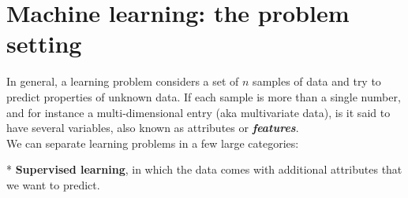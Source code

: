 
\section{Machine learning: the problem setting}

\noindent In general, a learning problem considers a set of $n$ samples of data and try to predict properties of unknown data. If
each sample is more than a single number, and for instance a multi-dimensional entry (aka multivariate data), is it said
to have several variables, also known as attributes or \textbf{\textit{features}}.\\

We can separate learning problems in a few large categories:


*  \textbf{Supervised learning}, in which the data comes with additional attributes that we want to predict.\\ 

